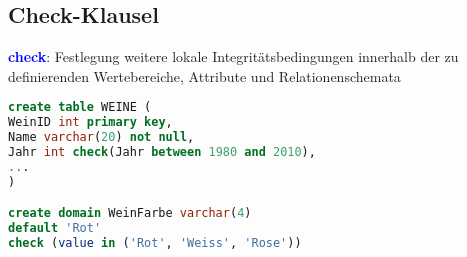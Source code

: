 \documentclass{scrartcl}
\newcommand{\key}[1]{{\textcolor{blue}{\textbf{#1}}}}
\begin{document}
\subsection{Check-Klausel}

\key{check}: Festlegung weitere lokale Integritätsbedingungen innerhalb der zu definierenden Wertebereiche, Attribute und Relationenschemata
\begin{lstlisting}[language=SQL]
create table WEINE (
WeinID int primary key,
Name varchar(20) not null,
Jahr int check(Jahr between 1980 and 2010),
...
)

create domain WeinFarbe varchar(4)
default 'Rot'
check (value in ('Rot', 'Weiss', 'Rose'))
\end{lstlisting}
\end{document}
